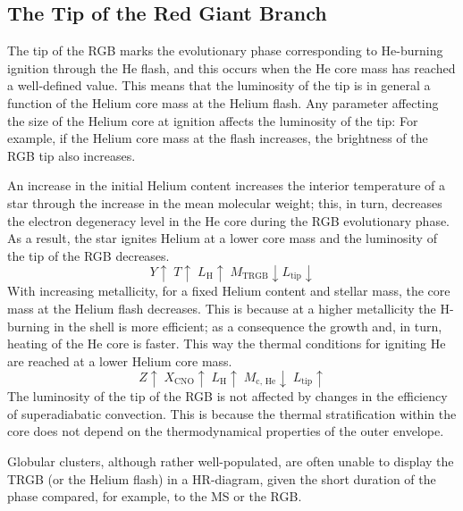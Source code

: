 \subsection{The Tip of the Red Giant Branch}

The tip of the RGB marks the evolutionary phase corresponding to He-burning ignition through the He flash, and this occurs when the He core mass has reached a well-defined value. This means that the luminosity of the tip is in general a function of the Helium core mass at the Helium flash. Any parameter affecting the size of the Helium core at ignition affects the luminosity of the tip: For example, if the Helium core mass at the flash increases, the brightness of the RGB tip also increases.

\begin{tcolorbox}[enhanced,attach boxed title to top center={yshift=-3mm,yshifttext=-1mm},
colback=blue!5!white,colframe=blue!75!black,colbacktitle=blue!80!black,
title=Helium and Metals Dependence of the TRGB,
boxed title style={size=small,colframe=blue!50!black}]
    An increase in the initial Helium content increases the interior temperature of a star through the increase in the mean molecular weight; this, in turn, decreases the electron degeneracy level in the He core during the RGB evolutionary phase. As a result, the star ignites Helium at a lower core mass and the luminosity of the tip of the RGB decreases. 
    $$ Y\uparrow\; T\uparrow\;L_{\text{H}}\uparrow\; M_{\text{TRGB}}\downarrow L_{\text{tip}}\downarrow $$
    With increasing metallicity, for a fixed Helium content and stellar mass, the core mass at the Helium flash decreases. This is because at a higher metallicity the H-burning in the shell is more efficient; as a consequence the growth and, in turn, heating of the He core is faster. This way the thermal conditions for igniting He are reached at a lower Helium core mass. 
    $$ Z\uparrow\; X_{\text{CNO}}\uparrow\;L_{\text{H}}\uparrow\;M_{\text{c, He}}\downarrow\;L_{\text{tip}}\uparrow$$
    The luminosity of the tip of the RGB is not affected by changes in the efficiency of superadiabatic convection. This is because the thermal stratification within the core does not depend on the thermodynamical properties of the outer envelope.
\end{tcolorbox}
\par Globular clusters, although rather well-populated, are often unable to display the TRGB (or the Helium flash) in a HR-diagram, given the short duration of the phase compared, for example, to the MS or the RGB.
